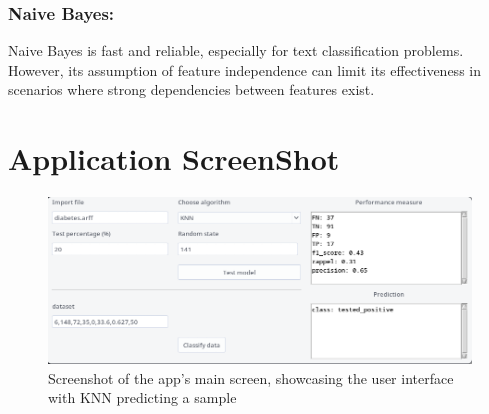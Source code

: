 \documentclass[a4paper,12pt]{article}
\begin{document}
\subsubsection*{Naive Bayes:}
Naive Bayes is fast and reliable, especially for text classification problems. However, its assumption of feature independence can limit its effectiveness in scenarios where strong dependencies between features exist.

\clearpage
\appendix
\section{Application ScreenShot}

\begin{figure}[ht]
    \centering
    \includegraphics[width=1\textwidth]{images/app.png}
    \caption{Screenshot of the app’s main screen, showcasing the user interface with KNN predicting a sample}
    \label{fig:app}
\end{figure}
\end{document}
